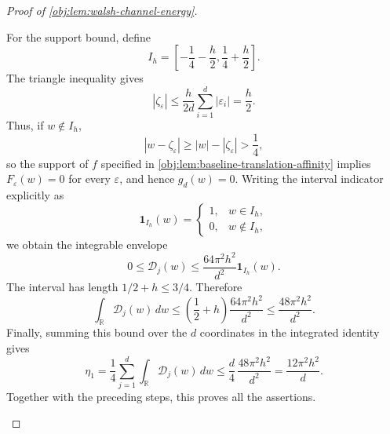 \begin{proof}[Proof of \cref{obj:lem:walsh-channel-energy}]
\begin{enumerate}
For the support bound, define
\[
I_h=\left[-\frac14-\frac h2,\frac14+\frac h2\right].
\]
The triangle inequality gives
\[
|\zeta_\varepsilon|
\le\frac{h}{2d}\sum_{i=1}^d|\varepsilon_i|
=\frac h2.
\]
Thus, if \(w\notin I_h\),
\[
|w-\zeta_\varepsilon|
\ge |w|-|\zeta_\varepsilon|>\frac14,
\]
so the support of \(f\) specified in
\cref{obj:lem:baseline-translation-affinity} implies
\(F_\varepsilon(w)=0\) for every \(\varepsilon\), and hence \(g_d(w)=0\).
Writing the interval indicator explicitly as
\[
\mathbf1_{I_h}(w)=
\begin{cases}
1,&w\in I_h,\\
0,&w\notin I_h,
\end{cases}
\]
we obtain the integrable envelope
\[
0\le\mathcal D_j(w)
\le\frac{64\pi^2h^2}{d^2}\mathbf1_{I_h}(w).
\]
The interval has length \(1/2+h\le3/4\). Therefore
\[
\int_{\mathbb R}\mathcal D_j(w)\,dw
\le
\left(\frac12+h\right)\frac{64\pi^2h^2}{d^2}
\le\frac{48\pi^2h^2}{d^2}.
\]
Finally, summing this bound over the \(d\) coordinates in the integrated identity gives
\[
\eta_1
=\frac14\sum_{j=1}^d\int_{\mathbb R}\mathcal D_j(w)\,dw
\le\frac d4\,\frac{48\pi^2h^2}{d^2}
=\frac{12\pi^2h^2}{d}.
\]
Together with the preceding steps, this proves all the assertions.
\end{enumerate}
\end{proof}
